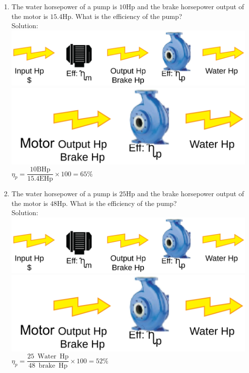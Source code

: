\documentclass{article}
\begin{document}
\begin{enumerate}
\item The water horsepower of a pump is $10 \mathrm{Hp}$ and the brake horsepower output of the motor is $15.4 \mathrm{Hp}$. What is the efficiency of the pump?\\
\vspace{0.2cm}
Solution:\\ 
 \vspace{0.2cm}
 \vspace{0.4cm}\includegraphics[scale=0.08]{PumpProblem}\\
 \vspace{0.2cm}
 \includegraphics[scale=0.32]{PumpingProblemPump}
 $\eta_p=\dfrac{10 \mathrm{BHp}}{15.4 \mathrm{EHp}} \times 100=\boxed{65 \%}$\\
 \vspace{0.2cm}
 \item The water horsepower of a pump is $25 \mathrm{Hp}$ and the brake horsepower output of the motor is $48 \mathrm{Hp}$. What is the efficiency of the pump?\\
 Solution:\\
  \vspace{0.2cm}
 \vspace{0.32cm}\includegraphics[scale=0.08]{PumpProblem}\\
 \vspace{0.2cm}
 \includegraphics[scale=0.4]{PumpingProblemPump}
 \vspace{0.2cm}
$\eta_p=\dfrac{25 \mathrm{\enspace Water \enspace Hp}}{48 \mathrm{\enspace brake \enspace Hp}} \times 100=\boxed{52 \%}$
  \vspace{0.4cm}
  

\end{enumerate}
\end{document}
